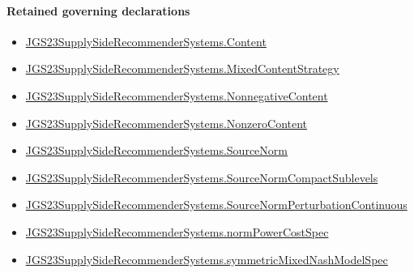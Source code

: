 \documentclass[10pt]{article}
\begin{document}
\paragraph{Retained governing declarations}
\begin{itemize}\raggedright
\item \hyperlink{governing-declaration-367305fda50f0ada}{JGS23\allowbreak{}Supply\allowbreak{}Side\allowbreak{}Recommender\allowbreak{}Systems.\allowbreak{}Content}
\item \hyperlink{governing-declaration-2089965d06cf0282}{JGS23\allowbreak{}Supply\allowbreak{}Side\allowbreak{}Recommender\allowbreak{}Systems.\allowbreak{}Mixed\allowbreak{}Content\allowbreak{}Strategy}
\item \hyperlink{governing-declaration-d426babe40b9593c}{JGS23\allowbreak{}Supply\allowbreak{}Side\allowbreak{}Recommender\allowbreak{}Systems.\allowbreak{}Nonnegative\allowbreak{}Content}
\item \hyperlink{governing-declaration-90e2ac7d13788c50}{JGS23\allowbreak{}Supply\allowbreak{}Side\allowbreak{}Recommender\allowbreak{}Systems.\allowbreak{}Nonzero\allowbreak{}Content}
\item \hyperlink{governing-declaration-6141339a5d3412d9}{JGS23\allowbreak{}Supply\allowbreak{}Side\allowbreak{}Recommender\allowbreak{}Systems.\allowbreak{}Source\allowbreak{}Norm}
\item \hyperlink{governing-declaration-0d92048317064110}{JGS23\allowbreak{}Supply\allowbreak{}Side\allowbreak{}Recommender\allowbreak{}Systems.\allowbreak{}Source\allowbreak{}Norm\allowbreak{}Compact\allowbreak{}Sublevels}
\item \hyperlink{governing-declaration-6ccc463be39b315f}{JGS23\allowbreak{}Supply\allowbreak{}Side\allowbreak{}Recommender\allowbreak{}Systems.\allowbreak{}Source\allowbreak{}Norm\allowbreak{}Perturbation\allowbreak{}Continuous}
\item \hyperlink{governing-declaration-6ba13dc1cae95e6e}{JGS23\allowbreak{}Supply\allowbreak{}Side\allowbreak{}Recommender\allowbreak{}Systems.\allowbreak{}norm\allowbreak{}Power\allowbreak{}Cost\allowbreak{}Spec}
\item \hyperlink{paper-prerequisite-b412efba7deb757f}{JGS23\allowbreak{}Supply\allowbreak{}Side\allowbreak{}Recommender\allowbreak{}Systems.\allowbreak{}symmetric\allowbreak{}Mixed\allowbreak{}Nash\allowbreak{}Model\allowbreak{}Spec}
\end{itemize}
\end{document}
